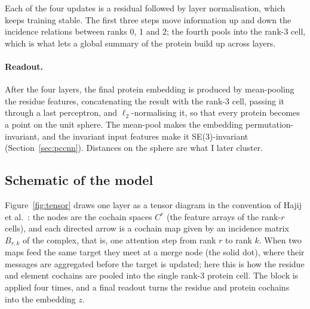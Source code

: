 \documentclass[11pt,a4paper]{article}
\theoremstyle{definition}
\begin{document}
Each of the four updates is a residual followed by layer normalisation, which
keeps training stable. The first three steps move information up and down the
incidence relations between ranks 0, 1 and 2; the fourth pools into the rank-3
cell, which is what lets a global summary of the protein build up across layers.

\paragraph{Readout.} After the four layers, the final protein embedding is
produced by mean-pooling the residue features, concatenating the result with the
rank-3 cell, passing it through a last perceptron, and $\ell_2$-normalising it, so
that every protein becomes a point on the unit sphere. The mean-pool makes the
embedding permutation-invariant, and the invariant input features make it
SE(3)-invariant (Section~\ref{sec:pccnn}). Distances on the sphere are what I
later cluster.

\subsection{Schematic of the model}

Figure~\ref{fig:tensor} draws one layer as a tensor diagram in the convention of
Hajij et al.~\cite{hoan}: the nodes are the cochain spaces $C^{r}$ (the feature
arrays of the rank-$r$ cells), and each directed arrow is a cochain map given by
an incidence matrix $B_{r,k}$ of the complex, that is, one attention step from
rank $r$ to rank $k$. When two maps feed the same target they meet at a merge node
(the solid dot), where their messages are aggregated before the target is updated;
here this is how the residue and element cochains are pooled into the single
rank-3 protein cell. The block is applied four times, and a final readout turns the
residue and protein cochains into the embedding $z$.
\end{document}
